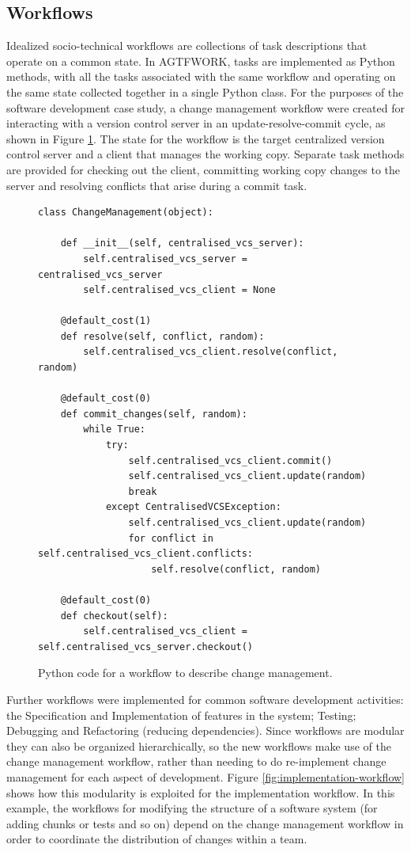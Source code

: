 \documentclass{llncs}
\begin{document}
\subsection{Workflows}

Idealized socio-technical workflows are collections of task descriptions that operate on a common state.  In AGTFWORK,
tasks are implemented as Python methods, with all the tasks associated with the same workflow and operating on the same
state collected together in a single Python class.  For the purposes of the software development case study, a change
management workflow were created for interacting with a version control server in an update-resolve-commit cycle, as
shown in Figure \ref{fig:change-management-workflow}.  The state for the workflow is the target centralized version
control server and a client that manages the working copy.  Separate task methods are provided for checking out the
client, committing working copy changes to the server and resolving conflicts that arise during a commit task.

\begin{figure}
  \centering
\begin{lstlisting}
class ChangeManagement(object):

    def __init__(self, centralised_vcs_server):
        self.centralised_vcs_server = centralised_vcs_server
        self.centralised_vcs_client = None

    @default_cost(1)
    def resolve(self, conflict, random):
        self.centralised_vcs_client.resolve(conflict, random)

    @default_cost(0)
    def commit_changes(self, random):
        while True:
            try:
                self.centralised_vcs_client.commit()
                self.centralised_vcs_client.update(random)
                break
            except CentralisedVCSException:
                self.centralised_vcs_client.update(random)
                for conflict in self.centralised_vcs_client.conflicts:
                    self.resolve(conflict, random)

    @default_cost(0)
    def checkout(self):
        self.centralised_vcs_client = self.centralised_vcs_server.checkout()
\end{lstlisting}
  
  \caption{Python code for a workflow to describe change management.}
  \label{fig:change-management-workflow}
\end{figure}

Further workflows were implemented for common software development activities: the Specification and Implementation of
features in the system; Testing; Debugging and Refactoring (reducing dependencies).  Since workflows are modular they
can also be organized hierarchically, so the new workflows make use of the change management workflow, rather than
needing to do re-implement change management for each aspect of development.  Figure \ref{fig:implementation-workflow}
shows how this modularity is exploited for the implementation workflow. In this example, the workflows for modifying the
structure of a software system (for adding chunks or tests and so on) depend on the change management workflow in order
to coordinate the distribution of changes within a team.
\end{document}
